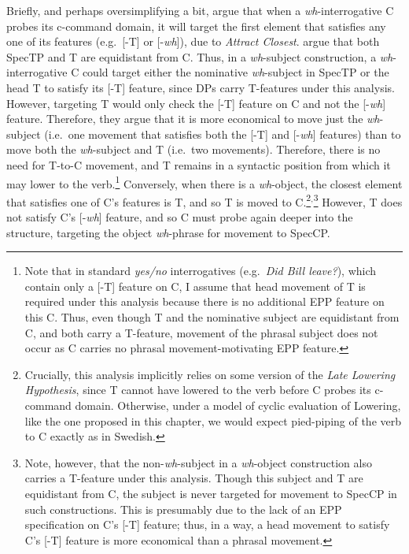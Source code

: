 Briefly, and perhaps oversimplifying a bit, \citeauthor{pesetsky_torrego2001} argue that when a {\it wh}-interrogative C probes its c-command domain, it will target the first element that satisfies any one of its features (e.g.\ [-T] or [-{\it wh}]), due to {\it Attract Closest}. \citeauthor{pesetsky_torrego2001} argue that both SpecTP and T are equidistant from C. Thus, in a {\it wh}-subject construction, a {\it wh}-interrogative C could target either the nominative {\it wh}-subject in SpecTP or the head T to satisfy its [-T] feature, since DPs carry T-features under this analysis. However, targeting T would only check the [-T] feature on C and not the [-{\it wh}] feature. Therefore, they argue that it is more economical to move just the {\it wh}-subject (i.e.\ one movement that satisfies both the [-T] and [-{\it wh}] features) than to move both the {\it wh}-subject and T (i.e.\ two movements). Therefore, there is no need for T-to-C movement, and T remains in a syntactic position from which it may lower to the verb.\footnote{Note that in standard {\it yes/no} interrogatives (e.g.\ {\it Did Bill leave?}), which contain only a [-T] feature on C, I assume that head movement of T is required under this analysis because there is no additional EPP feature on this C. Thus, even though T and the nominative subject are equidistant from C, and both carry a T-feature, movement of the phrasal subject does not occur as C carries no phrasal movement-motivating EPP feature.} Conversely, when there is a {\it wh}-object, the closest element that satisfies one of C's features is T, and so T is moved to C.\footnote{Crucially, this analysis implicitly relies on some version of the {\it Late Lowering Hypothesis}, since T cannot have lowered to the verb before C probes its c-command domain. Otherwise, under a model of cyclic evaluation of Lowering, like the one proposed in this chapter, we would expect pied-piping of the verb to C exactly as in Swedish.}$^{,}$\footnote{Note, however, that the non-{\it wh}-subject in a {\it wh}-object construction also carries a T-feature under this analysis. Though this subject and T are equidistant from C\raisebox{-3pt}{\scriptsize{[-T]}}, the subject is never targeted for movement to SpecCP in such constructions. This is presumably due to the lack of an EPP specification on C's [-T] feature; thus, in a way, a head movement to satisfy C's [-T] feature is more economical than a phrasal movement.} However, T does not satisfy C's [-{\it wh}] feature, and so C must probe again deeper into the structure, targeting the object {\it wh}-phrase for movement to SpecCP.

